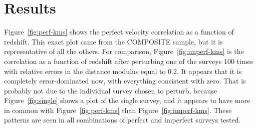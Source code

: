 \documentclass[letterpaper]{article}
\begin{document}
\section{Results}
Figure~\ref{fig:perf-kms} shows the perfect velocity correlation as a function of redshift. This exact plot came from the COMPOSITE sample, but it is representative of all the others. For comparison, Figure~\ref{fig:imperf-kms} is the correlation as a function of redshift after perturbing one of the surveys 100 times with relative errors in the distance modulus equal to 0.2. It appears that it is completely error-dominated now, with everything consistent with zero. That is probably not due to the individual survey chosen to perturb, because Figure~\ref{fig:single} shows a plot of the single survey, and it appears to have more in common with Figure~\ref{fig:perf-kms} than Figure~\ref{fig:imperf-kms}. These patterns are seen in all combinations of perfect and imperfect surveys tested.



\end{document}
